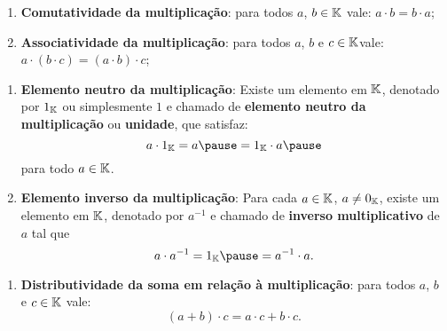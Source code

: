 \documentclass{beamer}
\begin{document}
    \begin{frame}
        \begin{definicao}
            \begin{enumerate}[label={\roman*})]
                \conti

		\item \textbf{Comutatividade da multiplica\c{c}\~ao}: para todos $a$, $b \in \mathbb{K}$ \pause vale: $a \cdot b = b \cdot a$;\pause
		\item \textbf{Associatividade da multiplica\c{c}\~ao}: para todos $a$, $b$ e $c \in \mathbb{K}$\pause vale: $a \cdot (b \cdot c) = (a \cdot b) \cdot c$;\pause

                \seti
            \end{enumerate}
        \end{definicao}
    \end{frame}

    \begin{frame}
        \begin{definicao}
            \begin{enumerate}[label={\roman*})]
                \conti

		\item \textbf{Elemento neutro da multiplica\c{c}\~ao}: Existe um elemento em $\mathbb{K}$, \pause denotado por $1_{\mathbb{K}}$ \pause ou simplesmente $1$ \pause e chamado de \textbf{elemento neutro da multiplica\c{c}\~ao} \pause ou \textbf{unidade}, que satisfaz:\pause
		\[
			a \cdot 1_\cp{K} = a \pause = 1_\cp{K} \cdot a\pause
		\]
		para todo $a \in \mathbb{K}$.\pause
            \item \textbf{Elemento inverso da multiplica\c{c}\~ao}: Para cada $a \in \mathbb{K}$, \pause $a \ne 0_{\mathbb{K}}$, \pause existe um elemento em $\mathbb{K}$, \pause denotado por $a^{-1}$ \pause e chamado de \textbf{inverso multiplicativo} de $a$ tal que\pause
		\[
			a \cdot a^{-1} = 1_\cp{K} \pause = a^{-1} \cdot a.
		\]
                \seti
            \end{enumerate}
        \end{definicao}
    \end{frame}

    \begin{frame}
        \begin{definicao}
            \begin{enumerate}[label={\roman*})]
                \conti

		\item \textbf{Distributividade da soma em rela\c{c}\~ao \`a multiplica\c{c}\~ao}: para todos $a$, $b$ e $c \in \mathbb{K}$ \pause vale:
                    \[
                        (a + b)\cdot c = a\cdot c + b\cdot c.
                    \]
	    \end{enumerate}
        \end{definicao}
    \end{frame}
\end{document}
